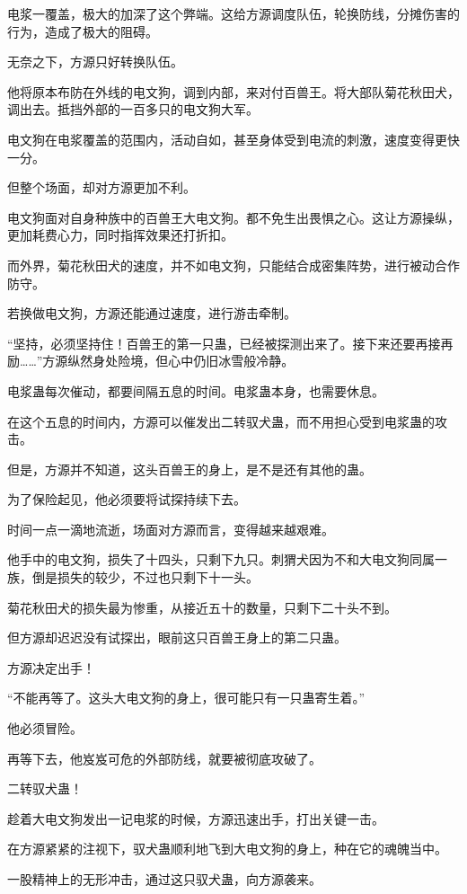 \begin{this_body}
电浆一覆盖，极大的加深了这个弊端。这给方源调度队伍，轮换防线，分摊伤害的行为，造成了极大的阻碍。

无奈之下，方源只好转换队伍。

他将原本布防在外线的电文狗，调到内部，来对付百兽王。将大部队菊花秋田犬，调出去。抵挡外部的一百多只的电文狗大军。

电文狗在电浆覆盖的范围内，活动自如，甚至身体受到电流的刺激，速度变得更快一分。

但整个场面，却对方源更加不利。

电文狗面对自身种族中的百兽王大电文狗。都不免生出畏惧之心。这让方源操纵，更加耗费心力，同时指挥效果还打折扣。

而外界，菊花秋田犬的速度，并不如电文狗，只能结合成密集阵势，进行被动合作防守。

若换做电文狗，方源还能通过速度，进行游击牵制。

“坚持，必须坚持住！百兽王的第一只蛊，已经被探测出来了。接下来还要再接再励……”方源纵然身处险境，但心中仍旧冰雪般冷静。

电浆蛊每次催动，都要间隔五息的时间。电浆蛊本身，也需要休息。

在这个五息的时间内，方源可以催发出二转驭犬蛊，而不用担心受到电浆蛊的攻击。

但是，方源并不知道，这头百兽王的身上，是不是还有其他的蛊。

为了保险起见，他必须要将试探持续下去。

时间一点一滴地流逝，场面对方源而言，变得越来越艰难。

他手中的电文狗，损失了十四头，只剩下九只。刺猬犬因为不和大电文狗同属一族，倒是损失的较少，不过也只剩下十一头。

菊花秋田犬的损失最为惨重，从接近五十的数量，只剩下二十头不到。

但方源却迟迟没有试探出，眼前这只百兽王身上的第二只蛊。

方源决定出手！

“不能再等了。这头大电文狗的身上，很可能只有一只蛊寄生着。”

他必须冒险。

再等下去，他岌岌可危的外部防线，就要被彻底攻破了。

二转驭犬蛊！

趁着大电文狗发出一记电浆的时候，方源迅速出手，打出关键一击。

在方源紧紧的注视下，驭犬蛊顺利地飞到大电文狗的身上，种在它的魂魄当中。

一股精神上的无形冲击，通过这只驭犬蛊，向方源袭来。


\end{this_body}
